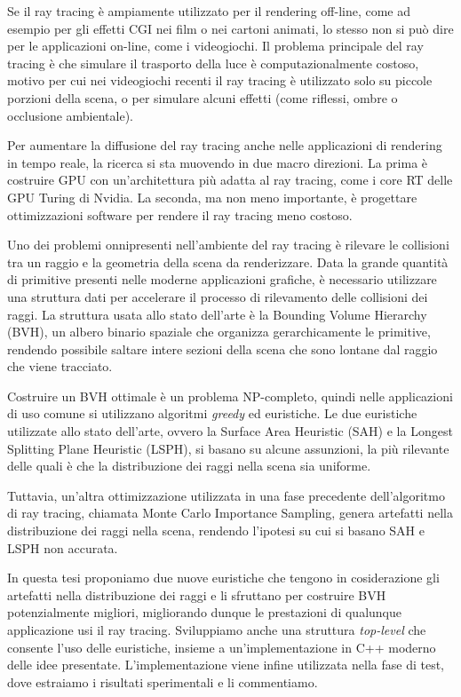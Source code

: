 \documentclass{PoliMi_MasterThesis}
\begin{document}
Se il ray tracing è ampiamente utilizzato per il rendering off-line, come ad esempio per gli effetti CGI nei film o nei cartoni animati, lo stesso non si può dire per le applicazioni on-line, come i videogiochi. Il problema principale del ray tracing è che simulare il trasporto della luce è computazionalmente costoso, motivo per cui nei videogiochi recenti il ray tracing è utilizzato solo su piccole porzioni della scena, o per simulare alcuni effetti (come riflessi, ombre o occlusione ambientale).

Per aumentare la diffusione del ray tracing anche nelle applicazioni di rendering in tempo reale, la ricerca si sta muovendo in due macro direzioni. La prima è costruire GPU con un'architettura più adatta al ray tracing, come i core RT delle GPU Turing di Nvidia. La seconda, ma non meno importante, è progettare ottimizzazioni software per rendere il ray tracing meno costoso.

Uno dei problemi onnipresenti nell'ambiente del ray tracing è rilevare le collisioni tra un raggio e la geometria della scena da renderizzare. Data la grande quantità di primitive presenti nelle moderne applicazioni grafiche, è necessario utilizzare una struttura dati per accelerare il processo di rilevamento delle collisioni dei raggi. La struttura usata allo stato dell'arte è la Bounding Volume Hierarchy (BVH), un albero binario spaziale che organizza gerarchicamente le primitive, rendendo possibile saltare intere sezioni della scena che sono lontane dal raggio che viene tracciato.

Costruire un BVH ottimale è un problema NP-completo, quindi nelle applicazioni di uso comune si utilizzano algoritmi \textit{greedy} ed euristiche. Le due euristiche utilizzate allo stato dell'arte, ovvero la Surface Area Heuristic (SAH) e la Longest Splitting Plane Heuristic (LSPH), si basano su alcune assunzioni, la più rilevante delle quali è che la distribuzione dei raggi nella scena sia uniforme.

Tuttavia, un'altra ottimizzazione utilizzata in una fase precedente dell'algoritmo di ray tracing, chiamata Monte Carlo Importance Sampling, genera artefatti nella distribuzione dei raggi nella scena, rendendo l'ipotesi su cui si basano SAH e LSPH non accurata.

In questa tesi proponiamo due nuove euristiche che tengono in cosiderazione gli artefatti nella distribuzione dei raggi e li sfruttano per costruire BVH potenzialmente migliori, migliorando dunque le prestazioni di qualunque applicazione usi il ray tracing. Sviluppiamo anche una struttura \textit{top-level} che consente l'uso delle euristiche, insieme a un'implementazione in C++ moderno delle idee presentate. L'implementazione viene infine utilizzata nella fase di test, dove estraiamo i risultati sperimentali e li commentiamo.
\end{document}
